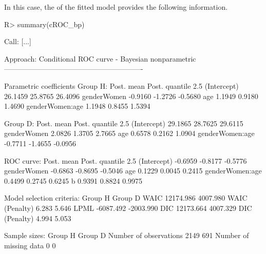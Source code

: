 In this case, the  of the fitted model provides the following information.
\begin{example}
R> summary(cROC_bp)
\end{example}
\begin{example}
Call: [...]
		
Approach: Conditional ROC curve - Bayesian nonparametric
----------------------------------------------------------

Parametric coefficients
Group H:
                   Post. mean    Post. quantile 2.5%
(Intercept)           26.1459                25.8765                 26.4096
genderWomen           -0.9160                -1.2726                 -0.5680
age                    1.1949                 0.9180                  1.4690
genderWomen:age        1.1948                 0.8455                  1.5394


Group D:
                   Post. mean    Post. quantile 2.5%
(Intercept)           29.1865                28.7625                 29.6115
genderWomen            2.0826                 1.3705                  2.7665
age                    0.6578                 0.2162                  1.0904
genderWomen:age       -0.7711                -1.4655                 -0.0956


ROC curve:
                   Post. mean    Post. quantile 2.5%
(Intercept)           -0.6959                -0.8177                 -0.5776
genderWomen           -0.6863                -0.8695                 -0.5046
age                    0.1229                 0.0045                  0.2415
genderWomen:age        0.4499                 0.2745                  0.6245
b                      0.9391                 0.8824                  0.9975


Model selection criteria:
                     Group H       Group D
WAIC               12174.986      4007.980
WAIC (Penalty)         6.283         5.646
LPML               -6087.492     -2003.990
DIC                12173.664      4007.329
DIC (Penalty)          4.994         5.053


Sample sizes:
                           Group H     Group D
Number of observations        2149         691
Number of missing data           0           0
\end{example}
